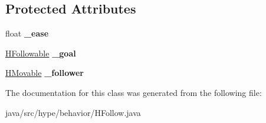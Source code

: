 \subsection*{Protected Attributes}
\begin{DoxyCompactItemize}
\item 
\hypertarget{classhype_1_1behavior_1_1_h_follow_a37c6ea2c768435a71cab8cc695526612}{float {\bfseries \-\_\-ease}}\label{classhype_1_1behavior_1_1_h_follow_a37c6ea2c768435a71cab8cc695526612}

\item 
\hypertarget{classhype_1_1behavior_1_1_h_follow_a23ba684e7c4bb13c43c7c0abc2210e8d}{\hyperlink{interfacehype_1_1interfaces_1_1_h_followable}{H\-Followable} {\bfseries \-\_\-goal}}\label{classhype_1_1behavior_1_1_h_follow_a23ba684e7c4bb13c43c7c0abc2210e8d}

\item 
\hypertarget{classhype_1_1behavior_1_1_h_follow_a980384761a607794e839445e0c2e3f5a}{\hyperlink{interfacehype_1_1interfaces_1_1_h_movable}{H\-Movable} {\bfseries \-\_\-follower}}\label{classhype_1_1behavior_1_1_h_follow_a980384761a607794e839445e0c2e3f5a}

\end{DoxyCompactItemize}


The documentation for this class was generated from the following file\-:\begin{DoxyCompactItemize}
\item 
java/src/hype/behavior/H\-Follow.\-java\end{DoxyCompactItemize}
